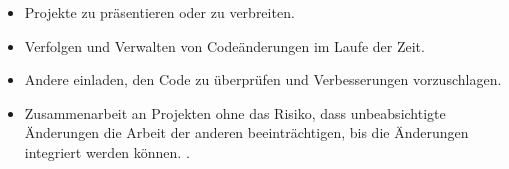 \begin{itemize}
	\item Projekte zu präsentieren oder zu verbreiten.
	\item Verfolgen und Verwalten von Codeänderungen im Laufe der Zeit.
	\item Andere einladen, den Code zu überprüfen und Verbesserungen vorzuschlagen.
	\item Zusammenarbeit an Projekten ohne das Risiko, dass unbeabsichtigte Änderungen die Arbeit der anderen beeinträchtigen, bis die Änderungen integriert werden können.  \cite{github:o.J}.
\end{itemize} 














